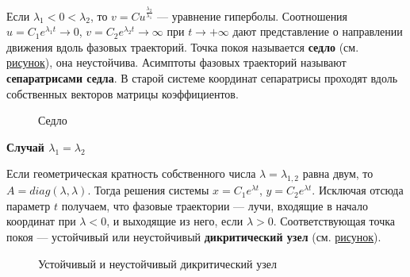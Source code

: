 \documentclass{article}
\begin{document}
Если $\lambda_1 < 0 < \lambda_2$, то $v = Cu^{\frac{\lambda_2}{\lambda_1}}$ --- уравнение гиперболы. Соотношения $u = C_1e^{\lambda_1 t} \to 0$, $v = C_2e^{\lambda_2 t} \to \infty$ при $t \to +\infty$ дают представление о направлении движения вдоль фазовых траекторий. Точка покоя называется \textbf{седло} (см. \hyperref[sedlo]{рисунок}), она неустойчива. Асимптоты фазовых траекторий называют \textbf{сепаратрисами седла}. В старой системе координат сепаратрисы проходят вдоль собственных векторов матрицы коэффициентов.

\begin{figure}[H]\label{sedlo}
    \caption{Седло}
\end{figure}

\noindent \textbf{Случай $\lambda_1 = \lambda_2$}

Если геометрическая кратность собственного числа $\lambda = \lambda_{1,2}$ равна двум, то $A = diag(\lambda, \lambda)$. Тогда решения системы $x = C_1e^{\lambda t}$, $y = C_2e^{\lambda t}$. Исключая отсюда параметр $t$ получаем, что фазовые траектории --- лучи, входящие в начало координат при $\lambda < 0$, и выходящие из него, если $\lambda > 0$. Соответствующая точка покоя --- устойчивый или неустойчивый \textbf{дикритический узел} (см. \hyperref[dikrit]{рисунок}).

\begin{figure}[H]\label{dikrit}
    \caption{Устойчивый и неустойчивый дикритический узел}
\end{figure}
\end{document}
